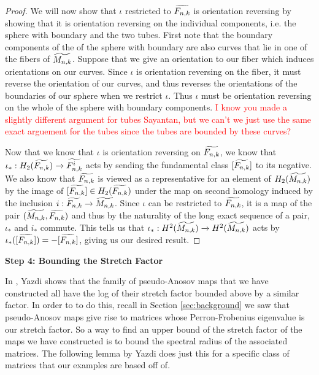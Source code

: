 \begin{proof}
We will now show that $\iota$ restricted to $\widetilde{F_{n,k}}$ is orientation reversing by showing that it is orientation reversing on the individual components, i.e. the sphere with boundary and the two tubes. First note that the boundary components of the of the sphere with boundary are also curves that lie in one of the fibers of $\widetilde{M_{n,k}}$. Suppose that we give an orientation to our fiber which induces orientations on our curves. Since $\iota$ is orientation reversing on the fiber, it must reverse the orientation of our curves, and thus reverses the orientations of the boundaries of our sphere when we restrict $\iota$. Thus $\iota$ must be orientation reversing on the whole of the sphere with boundary components. \textcolor{red}{I know you made a slightly different argument for tubes Sayantan, but we can't we just use the same exact arguement for the tubes since the tubes are bounded by these curves?}

Now that we know that $\iota$ is orientation reversing on $\widetilde{F_{n,k}}$, we know that $\iota_*: H_2(\widetilde{F_{n,k}}) \xrightarrow{} \widetilde{F^i_{n,k}}$ acts by sending the fundamental class $[\widetilde{F_{n,k}}]$ to its negative. We also know that $\widetilde{F_{n,k}}$ is viewed as a representative for an element of $H_2(\widetilde{M_{n,k}})$ by the image of $[\widetilde{F_{n,k}}] \in H_2(\widetilde{F_{n,k}})$ under the map on second homology induced by the inclusion $i: \widetilde{F_{n,k}} \xrightarrow[]{} \widetilde{M_{n,k}}$. Since $\iota$ can be restricted to $\widetilde{F_{n,k}}$, it is a map of the pair $(\widetilde{M_{n,k}},\widetilde{F_{n,k}})$ and thus by the naturality of the long exact sequence of a pair, $\iota_*$ and $i_*$ commute. This tells us that $\iota_*: H^2(\widetilde{M_{n,k}}) \xrightarrow[]{} H^2(\widetilde{M_{n,k}})$ acts by $\iota_*([\widetilde{F_{n,k}}]) = -[\widetilde{F_{n,k}}]$, giving us our desired result.
\end{proof}

\begin{center}
\textbf{Step 4: Bounding the Stretch Factor}
\end{center}

In \cite{yazdi2018pseudo}, Yazdi shows that the family of pseudo-Anosov maps that we have constructed all have the log of their stretch factor bounded above by a similar factor. In order to to do this, recall in Section \ref{sec:background} we saw that pseudo-Anosov maps give rise to matrices whose Perron-Frobenius eigenvalue is our stretch factor. So a way to find an upper bound of the stretch factor of the maps we have constructed is to bound the spectral radius of the associated matrices. The following lemma by Yazdi does just this for a specific class of matrices that our examples are based off of.

